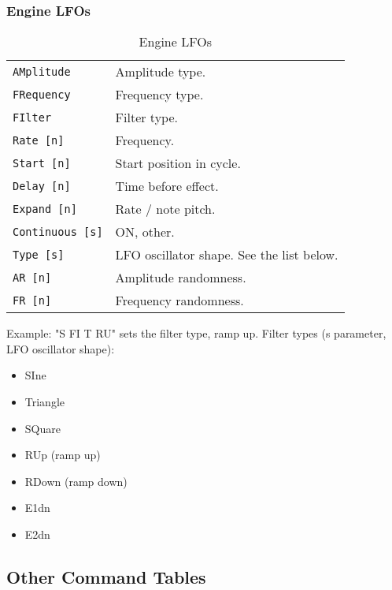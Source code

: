 \subsubsection{Engine LFOs}
\label{subsec:command_line_engine_lfos}

   \begin{table}[H]
      \centering
      \caption{Engine LFOs}
      \label{table:yoshimi_engine_lfos}
      \begin{tabular}{l l}

\texttt{AMplitude} &
   Amplitude type. \\
\texttt{FRequency} &
   Frequency type. \\
\texttt{FIlter} &
   Filter type. \\
\texttt{Rate [n]} &
   Frequency. \\
\texttt{Start [n]} &
   Start position in cycle. \\
\texttt{Delay [n]} &
   Time before effect. \\
\texttt{Expand [n]} &
   Rate / note pitch. \\
\texttt{Continuous [s]} &
   ON, other. \\
\texttt{Type [s]} &
   LFO oscillator shape. See the list below. \\
\texttt{AR [n]} &
   Amplitude randomness. \\
\texttt{FR [n]} &
   Frequency randomness. \\

      \end{tabular}
   \end{table}

Example: "S FI T RU" sets the filter type, ramp up.
Filter types (s parameter, LFO oscillator shape):

   \begin{itemize}
      \item SIne
      \item Triangle
      \item SQuare
      \item RUp (ramp up)
      \item RDown (ramp down)
      \item E1dn
      \item E2dn
   \end{itemize}

\subsection{Other Command Tables}
\label{subsec:command_line_other_command_tables}

